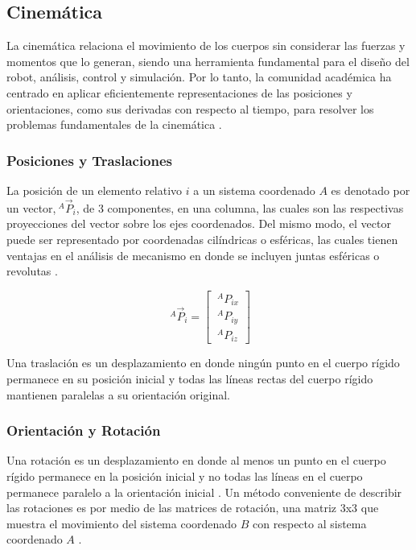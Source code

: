 \subsection*{Cinemática}
La cinemática relaciona el movimiento de los cuerpos sin considerar las fuerzas y momentos que lo generan, siendo una herramienta fundamental para el diseño del robot, análisis, control y simulación. Por lo tanto, la comunidad académica ha centrado en aplicar eficientemente representaciones de las posiciones y orientaciones, como sus derivadas con respecto al tiempo, para resolver los problemas fundamentales de la cinemática \citep{waldron2016kinematics}.

\subsubsection*{Posiciones y Traslaciones} 
La posición de un elemento relativo $i$ a un sistema coordenado $A$ es denotado por un vector,$~^{A}\vec{P}_i$, de 3 componentes, en una columna, las cuales son las respectivas proyecciones del vector sobre los ejes coordenados. Del mismo modo, el vector puede ser representado por coordenadas cilíndricas o esféricas, las cuales tienen ventajas en el análisis de mecanismo en donde se incluyen juntas esféricas o revolutas \citep{waldron2016kinematics}.

\begin{equation}
    ~^{A}\vec{P}_i = \left[\begin{array}{c} ~^{A}P_{ix} \\ ~^{A}P_{iy} \\ ~^{A}P_{iz} \end{array}\right]
\end{equation}

Una traslación es un desplazamiento en donde ningún punto en el cuerpo rígido permanece en su posición inicial y todas las líneas rectas del cuerpo rígido mantienen paralelas a su orientación original.

\subsubsection*{Orientación y Rotación}
Una rotación es un desplazamiento en donde al menos un punto en el cuerpo rígido permanece en la posición inicial y no todas las líneas en el cuerpo permanece paralelo a la orientación inicial \citep{waldron2016kinematics}. Un método conveniente de describir las rotaciones es por medio de las matrices de rotación, una matriz 3x3 que muestra el movimiento del sistema coordenado $B$ con respecto al sistema coordenado $A$ \citep{taghirad2013parallel}.

